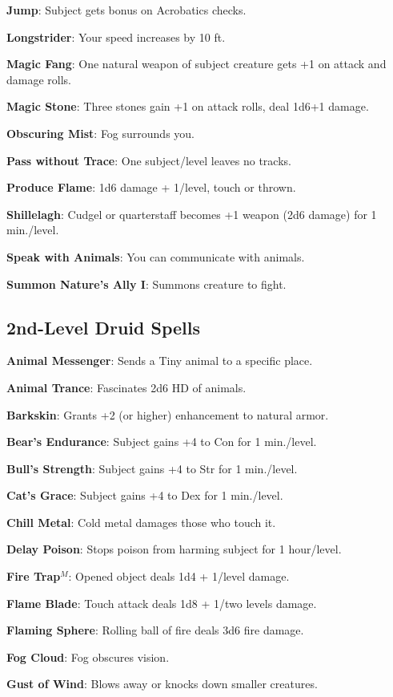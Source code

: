 \textbf{Jump}: Subject gets bonus on Acrobatics checks.

\textbf{Longstrider}: Your speed increases by 10 ft.

\textbf{Magic Fang}: One natural weapon of subject creature gets +1 on attack and damage rolls.

\textbf{Magic Stone}: Three stones gain +1 on attack rolls, deal 1d6+1 damage.

\textbf{Obscuring Mist}: Fog surrounds you.

\textbf{Pass without Trace}: One subject/level leaves no tracks.

\textbf{Produce Flame}: 1d6 damage + 1/level, touch or thrown.

\textbf{Shillelagh}: Cudgel or quarterstaff becomes +1 weapon (2d6 damage) for 1 min./level.

\textbf{Speak with Animals}: You can communicate with animals.

\textbf{Summon Nature's Ally I}: Summons creature to fight.

\subsection{2nd-Level Druid Spells}


\textbf{Animal Messenger}: Sends a Tiny animal to a specific place.

\textbf{Animal Trance}: Fascinates 2d6 HD of animals.

\textbf{Barkskin}: Grants +2 (or higher) enhancement to natural armor.

\textbf{Bear's Endurance}: Subject gains +4 to Con for 1 min./level.

\textbf{Bull's Strength}: Subject gains +4 to Str for 1 min./level.

\textbf{Cat's Grace}: Subject gains +4 to Dex for 1 min./level.

\textbf{Chill Metal}: Cold metal damages those who touch it.

\textbf{Delay Poison}: Stops poison from harming subject for 1 hour/level.

\textbf{Fire Trap}\(^{M}\): Opened object deals 1d4 + 1/level damage.

\textbf{Flame Blade}: Touch attack deals 1d8 + 1/two levels damage.

\textbf{Flaming Sphere}: Rolling ball of fire deals 3d6 fire damage.

\textbf{Fog Cloud}: Fog obscures vision.

\textbf{Gust of Wind}: Blows away or knocks down smaller creatures.

